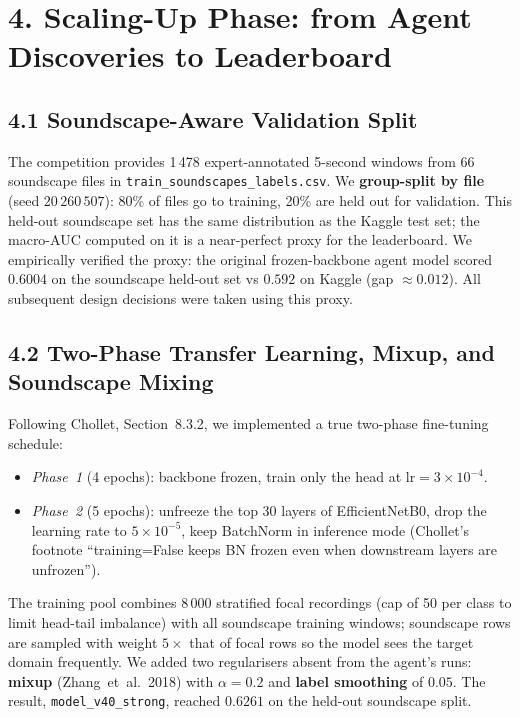 \documentclass[11pt,a4paper]{article}
\begin{document}
\section*{4. Scaling-Up Phase: from Agent Discoveries to Leaderboard}

\subsection*{4.1 Soundscape-Aware Validation Split}

The competition provides 1\,478 expert-annotated 5-second windows from 66 soundscape files in \texttt{train\_soundscapes\_labels.csv}. We \textbf{group-split by file} (seed $20\,260\,507$): 80\% of files go to training, 20\% are held out for validation. This held-out soundscape set has the same distribution as the Kaggle test set; the macro-AUC computed on it is a near-perfect proxy for the leaderboard. We empirically verified the proxy: the original frozen-backbone agent model scored $0.6004$ on the soundscape held-out set vs $0.592$ on Kaggle (gap $\approx 0.012$). All subsequent design decisions were taken using this proxy.

\subsection*{4.2 Two-Phase Transfer Learning, Mixup, and Soundscape Mixing}

Following Chollet, Section~8.3.2, we implemented a true two-phase fine-tuning schedule:
\begin{itemize}
\item \emph{Phase~1} (4 epochs): backbone frozen, train only the head at $\text{lr}=3\times 10^{-4}$.
\item \emph{Phase~2} (5 epochs): unfreeze the top 30 layers of EfficientNetB0, drop the learning rate to $5\times 10^{-5}$, keep BatchNorm in inference mode (Chollet's footnote ``training=False keeps BN frozen even when downstream layers are unfrozen'').
\end{itemize}
The training pool combines 8\,000 stratified focal recordings (cap of 50 per class to limit head-tail imbalance) with all soundscape training windows; soundscape rows are sampled with weight $5\times$ that of focal rows so the model sees the target domain frequently. We added two regularisers absent from the agent's runs: \textbf{mixup} (Zhang~et~al.~2018) with $\alpha=0.2$ and \textbf{label smoothing} of $0.05$. The result, \texttt{model\_v40\_strong}, reached $0.6261$ on the held-out soundscape split.
\end{document}
